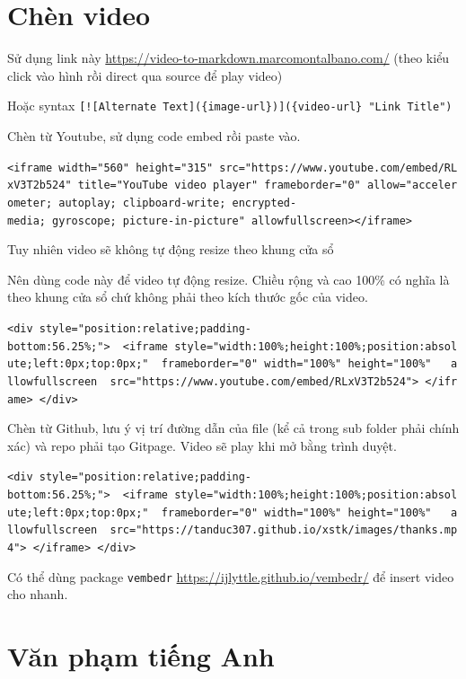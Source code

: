 \documentclass[
]{book}
\begin{document}
\hypertarget{chuxe8n-video}{%
\section{Chèn video}\label{chuxe8n-video}}

Sử dụng link này \url{https://video-to-markdown.marcomontalbano.com/} (theo kiểu click vào hình rồi direct qua source để play video)

Hoặc syntax \texttt{{[}!{[}Alternate\ Text{]}(\{image-url\}){]}(\{video-url\}\ "Link\ Title")}

Chèn từ Youtube, sử dụng code embed rồi paste vào.

\texttt{\textless{}iframe\ width="560"\ height="315"\ src="https://www.youtube.com/embed/RLxV3T2b524"\ title="YouTube\ video\ player"\ frameborder="0"\ allow="accelerometer;\ autoplay;\ clipboard-write;\ encrypted-media;\ gyroscope;\ picture-in-picture"\ allowfullscreen\textgreater{}\textless{}/iframe\textgreater{}}

Tuy nhiên video sẽ không tự động resize theo khung cửa sổ

Nên dùng code này để video tự động resize. Chiều rộng và cao 100\% có nghĩa là theo khung cửa sổ chứ không phải theo kích thước gốc của video.

\texttt{\textless{}div\ style="position:relative;padding-bottom:56.25\%;"\textgreater{}\ \ \textless{}iframe\ style="width:100\%;height:100\%;position:absolute;left:0px;top:0px;"\ \ frameborder="0"\ width="100\%"\ height="100\%"\ \ \ allowfullscreen\ \ src="https://www.youtube.com/embed/RLxV3T2b524"\textgreater{}\ \textless{}/iframe\textgreater{}\ \textless{}/div\textgreater{}}

Chèn từ Github, lưu ý vị trí đường dẫn của file (kể cả trong sub folder phải chính xác) và repo phải tạo Gitpage. Video sẽ play khi mở bằng trình duyệt.

\texttt{\textless{}div\ style="position:relative;padding-bottom:56.25\%;"\textgreater{}\ \ \textless{}iframe\ style="width:100\%;height:100\%;position:absolute;left:0px;top:0px;"\ \ frameborder="0"\ width="100\%"\ height="100\%"\ \ \ allowfullscreen\ \ src="https://tanduc307.github.io/xstk/images/thanks.mp4"\textgreater{}\ \textless{}/iframe\textgreater{}\ \textless{}/div\textgreater{}}

Có thể dùng package \texttt{vembedr} \url{https://ijlyttle.github.io/vembedr/} để insert video cho nhanh.

\hypertarget{vux103n-phux1ea1m-tiux1ebfng-anh}{%
\section{Văn phạm tiếng Anh}\label{vux103n-phux1ea1m-tiux1ebfng-anh}}
\end{document}
